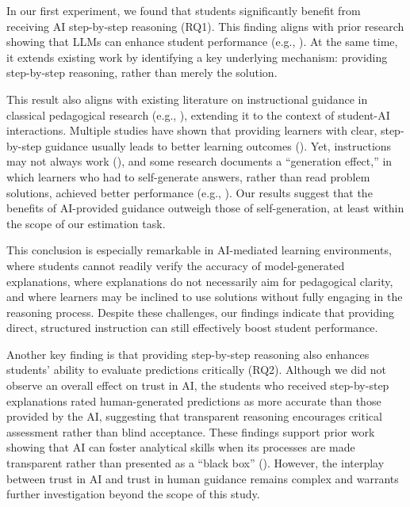 \documentclass[
  11pt,
]{article}
\begin{document}
In our first experiment, we found that students significantly benefit from receiving AI step-by-step reasoning (RQ1). This finding aligns with prior research showing that LLMs can enhance student performance (e.g., ). At the same time, it extends existing work by identifying a key underlying mechanism: providing step-by-step reasoning, rather than merely the solution.

This result also aligns with existing literature on instructional guidance in classical pedagogical research (e.g., ), extending it to the context of student-AI interactions. Multiple studies have shown that providing learners with clear, step-by-step guidance usually leads to better learning outcomes (). Yet, instructions may not always work (), and some research documents a ``generation effect,'' in which learners who had to self-generate answers, rather than read problem solutions, achieved better performance (e.g., ). Our results suggest that the benefits of AI-provided guidance outweigh those of self-generation, at least within the scope of our estimation task.

This conclusion is especially remarkable in AI-mediated learning environments, where students cannot readily verify the accuracy of model-generated explanations, where explanations do not necessarily aim for pedagogical clarity, and where learners may be inclined to use solutions without fully engaging in the reasoning process. Despite these challenges, our findings indicate that providing direct, structured instruction can still effectively boost student performance.

Another key finding is that providing step-by-step reasoning also enhances students' ability to evaluate predictions critically (RQ2). Although we did not observe an overall effect on trust in AI, the students who received step-by-step explanations rated human-generated predictions as more accurate than those provided by the AI, suggesting that transparent reasoning encourages critical assessment rather than blind acceptance. These findings support prior work showing that AI can foster analytical skills when its processes are made transparent rather than presented as a ``black box'' (). However, the interplay between trust in AI and trust in human guidance remains complex and warrants further investigation beyond the scope of this study.
\end{document}
